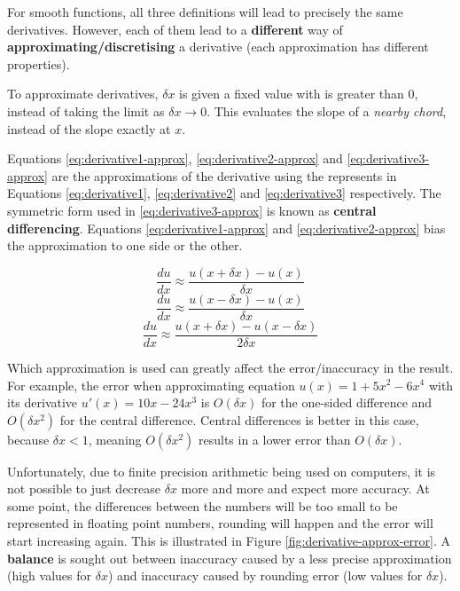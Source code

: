 \documentclass{article}
\begin{document}
For smooth functions, all three definitions will lead to precisely the same derivatives. However, each of them lead to a \textbf{different} way of \textbf{approximating/discretising} a derivative (each approximation has different properties).

To approximate derivatives, $\delta x$ is given a fixed value with is greater than 0, instead of taking the limit as $\delta x \rightarrow 0$. This evaluates the slope of a \textit{nearby chord}, instead of the slope exactly at $x$. 

Equations \ref{eq:derivative1-approx}, \ref{eq:derivative2-approx} and \ref{eq:derivative3-approx} are the approximations of the derivative using the represents in Equations \ref{eq:derivative1}, \ref{eq:derivative2} and \ref{eq:derivative3} respectively. The symmetric form used in  \ref{eq:derivative3-approx} is known as \textbf{central differencing}. Equations \ref{eq:derivative1-approx}  and \ref{eq:derivative2-approx}  bias the approximation to one side or the other.

\begin{equation}
	\frac{du}{dx} \approx \frac{u(x + \delta x) - u(x)}{\delta x}
	\label{eq:derivative1-approx}
\end{equation}
\begin{equation}
	\frac{du}{dx} \approx \frac{u(x - \delta x) - u(x)}{\delta x}
	\label{eq:derivative2-approx}
\end{equation}
\begin{equation}
	\frac{du}{dx} \approx \frac{u(x + \delta x) - u(x - \delta x)}{2\delta x}
	\label{eq:derivative3-approx}
\end{equation}

Which approximation is used can greatly affect the error/inaccuracy in the result. For example, the error when approximating equation $u(x) = 1 + 5x^2 - 6x^4$ with its derivative $u'(x) = 10x - 24x^3$ is $O(\delta x)$ for the one-sided difference and $O(\delta x^2)$ for the central difference. Central differences is better in this case, because $\delta x < 1$, meaning $O(\delta x^2)$ results in a lower error than $O(\delta x)$.

Unfortunately, due to finite precision arithmetic being used on computers, it is not possible to just decrease $\delta x$ more and more and expect more accuracy. At some point, the differences between the numbers will be too small to be represented in floating point numbers, rounding will happen and the error will start increasing again. This is illustrated in Figure \ref{fig:derivative-approx-error}. A \textbf{balance} is sought out between inaccuracy caused by a less precise approximation (high values for $\delta x$) and inaccuracy caused by rounding error (low values for $\delta x$).
\end{document}
